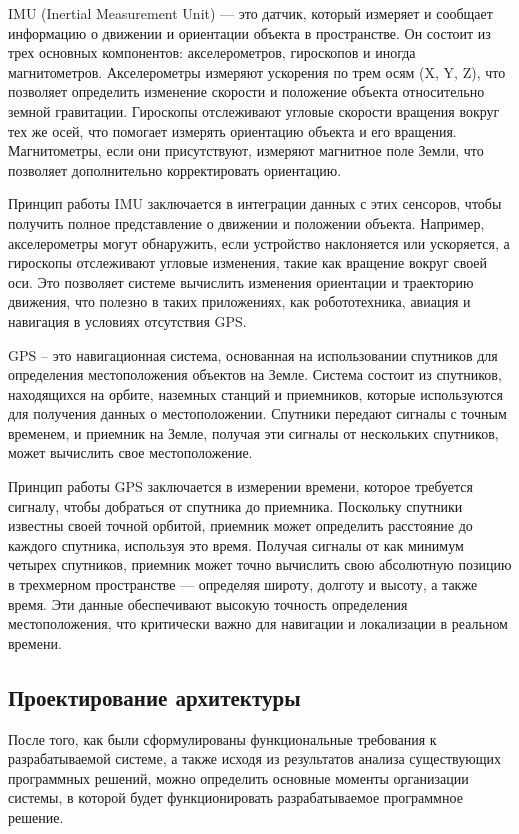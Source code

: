 IMU (Inertial Measurement Unit) — это датчик, который измеряет и сообщает
информацию о движении и ориентации объекта в пространстве. Он состоит из трех
основных компонентов: акселерометров, гироскопов и иногда магнитометров.
Акселерометры измеряют ускорения по трем осям (X, Y, Z), что позволяет
определить изменение скорости и положение объекта относительно земной
гравитации. Гироскопы отслеживают угловые скорости вращения вокруг тех же осей,
что помогает измерять ориентацию объекта и его вращения. Магнитометры, если они
присутствуют, измеряют магнитное поле Земли, что позволяет дополнительно
корректировать ориентацию.

Принцип работы IMU заключается в интеграции данных с этих сенсоров, чтобы
получить полное представление о движении и положении объекта. Например,
акселерометры могут обнаружить, если устройство наклоняется или ускоряется, а
гироскопы отслеживают угловые изменения, такие как вращение вокруг своей оси.
Это позволяет системе вычислить изменения ориентации и траекторию движения, что
полезно в таких приложениях, как робототехника, авиация и навигация в условиях
отсутствия GPS.

GPS -- это навигационная система, основанная на использовании спутников для
определения местоположения объектов на Земле. Система состоит из спутников,
находящихся на орбите, наземных станций и приемников, которые используются для
получения данных о местоположении. Спутники передают сигналы с точным временем,
и приемник на Земле, получая эти сигналы от нескольких спутников, может
вычислить свое местоположение.

Принцип работы GPS заключается в измерении времени, которое требуется сигналу,
чтобы добраться от спутника до приемника. Поскольку спутники известны своей
точной орбитой, приемник может определить расстояние до каждого спутника,
используя это время. Получая сигналы от как минимум четырех спутников, приемник
может точно вычислить свою абсолютную позицию в трехмерном пространстве —
определяя широту, долготу и высоту, а также время. Эти данные обеспечивают
высокую точность определения местоположения, что критически важно для навигации
и локализации в реальном времени.


\subsection{Проектирование архитектуры}	

После того, как были сформулированы функциональные требования к разрабатываемой
системе,  а  также  исходя  из  результатов  анализа  существующих
программных решений, можно определить основные моменты организации системы,  в
которой  будет  функционировать  разрабатываемое  программное  решение.

